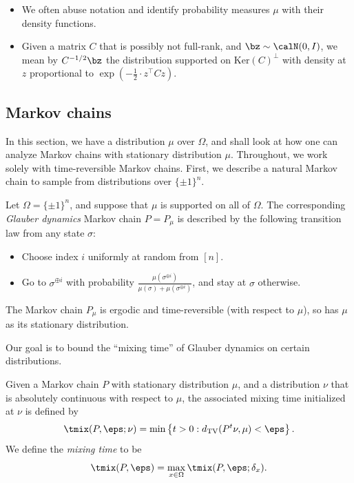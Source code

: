 \documentclass[11pt,letterpaper]{article}
\begin{document}
\begin{itemize}
        \item We often abuse notation and identify probability measures $\mu$ with their density functions.
        \item Given a matrix $C$ that is possibly not full-rank, and $\bz \sim \calN(0,I)$, we mean by $C^{-1/2} \bz$ the distribution supported on $\mathrm{Ker}(C)^\perp$ with density at $z$ proportional to $\exp\left(-\frac{1}{2} \cdot z^\top C z\right)$.
    \end{itemize}

\subsection{Markov chains}
    
    In this section, we have a distribution $\mu$ over $\Omega$, and shall look at how one can analyze Markov chains with stationary distribution $\mu$. Throughout, we work solely with time-reversible Markov chains. 
    First, we describe a natural Markov chain to sample from distributions over $\{\pm 1\}^n$.
    \begin{definition}
        Let $\Omega = \{\pm 1\}^n$, and suppose that $\mu$ is supported on all of $\Omega$. The corresponding \emph{Glauber dynamics} Markov chain $P = P_\mu$ is described by the following transition law from any state $\sigma$:
        \begin{itemize}
            \item Choose index $i$ uniformly at random from $[n]$.
            \item Go to $\sigma^{\oplus i}$ with probability $\displaystyle\frac{\mu(\sigma^{\oplus i})}{\mu(\sigma)+\mu(\sigma^{\oplus i})}$, and stay at $\sigma$ otherwise.
        \end{itemize}
    \end{definition}

    \begin{fact}
        The Markov chain $P_\mu$ is ergodic and time-reversible (with respect to $\mu$), so has $\mu$ as its stationary distribution.
    \end{fact}

    Our goal is to bound the ``mixing time'' of Glauber dynamics on certain distributions.

    \begin{definition}
        Given a Markov chain $P$ with stationary distribution $\mu$, and a distribution $\nu$ that is absolutely continuous with respect to $\mu$, the associated mixing time initialized at $\nu$ is defined by
        \[ \tmix(P,\eps;\nu) = \min\left\{ t > 0 : d_{\mathrm{TV}}(P^t\nu,\mu) < \eps \right\}. \]
        We define the \emph{mixing time} to be
        \[ \tmix(P,\eps) = \max_{x \in \Omega}\tmix(P,\eps;\delta_x). \]
    \end{definition}
\end{document}
